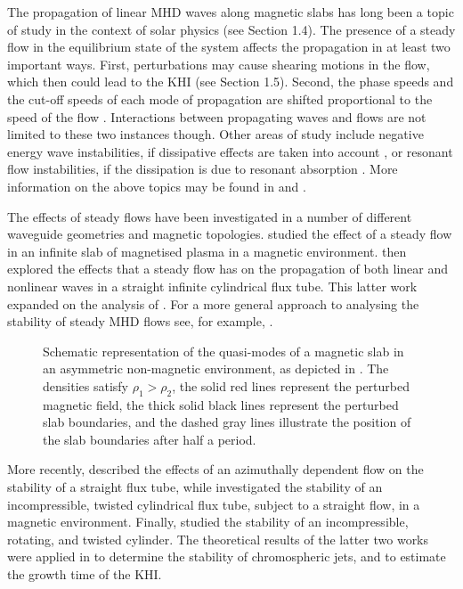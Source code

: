 The propagation of linear MHD waves along magnetic slabs has long been a topic of study in the context of solar physics (see Section 1.4).
The presence of a steady flow in the equilibrium state of the system affects the propagation in at least two important ways.
First, perturbations may cause shearing motions in the flow, which then could lead to the KHI (see Section 1.5).
Second, the phase speeds and the cut-off speeds of each mode of propagation are shifted proportional to the speed of the flow \citep{Nakariakov1995, Terra-Homem2003}.
Interactions between propagating waves and flows are not limited to these two instances though.
Other areas of study include negative energy wave instabilities, if dissipative effects are taken into account \citep{Cairns1979, Joarder1997}, or resonant flow instabilities, if the dissipation is due to resonant absorption \citep[see][]{Tirry1998, Taroyan2002}. More information on the above topics may be found in \cite{Taroyan2011} and \cite{Ryutova2015}.

The effects of steady flows have been investigated in a number of different waveguide geometries and magnetic topologies.
\cite{Nakariakov1995} studied the effect of a steady flow in an infinite slab of magnetised plasma in a magnetic environment.
\cite{Terra-Homem2003} then explored the effects that a steady flow has on the propagation of both linear and nonlinear waves in a straight infinite cylindrical flux tube.
This latter work expanded on the analysis of \cite{Somasundaram1999}.
For a more general approach to analysing the stability of steady MHD flows see, for example, \cite{Goedbloed2009a, Goedbloed2009b, Goedbloed2018a, Goedbloed2018b}.

\begin{figure}[t]
\centering
{}
\caption{Schematic representation of the quasi-modes of a magnetic slab in an asymmetric non-magnetic environment, as depicted in \cite{Allcock2017}.
The densities satisfy $\rho_1 > \rho_2$, the solid red lines represent the perturbed magnetic field, the thick solid black lines represent the perturbed slab boundaries, and the dashed gray lines illustrate the position of the slab boundaries after half a period.}
\label{fig:quasimodes}
\end{figure}

More recently, \cite{Soler2010} described the effects of an azimuthally dependent flow on the stability of a straight flux tube, while \cite{Zaqarashvili2014a} investigated the stability of an incompressible, twisted cylindrical flux tube, subject to a straight flow, in a magnetic environment.
Finally, \cite{Zaqarashvili2015} studied the stability of an incompressible, rotating, and twisted cylinder.
The theoretical results of the latter two works were applied in \cite{Kuridze2016} to determine the stability of chromospheric jets, and to estimate the growth time of the KHI.

